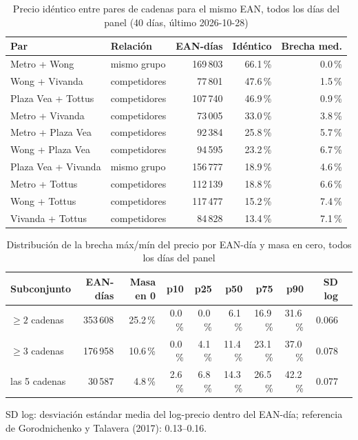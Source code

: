 
\begin{table}[htbp]
\caption{Precio id\'entico entre pares de cadenas para el mismo EAN, todos los d\'ias del panel (40 d\'ias, \'ultimo 2026-10-28)}
\label{tab:identidad}
\centering\scriptsize\setlength{\tabcolsep}{3pt}
\begin{tabular}{@{}llrrr@{}}
\toprule
Par & Relaci\'on & EAN-d\'ias & Id\'entico & Brecha med. \\
\midrule
Metro + Wong & mismo grupo & 169\,803 & 66.1\,\% & 0.0\,\% \\
Wong + Vivanda & competidores & 77\,801 & 47.6\,\% & 1.5\,\% \\
Plaza Vea + Tottus & competidores & 107\,740 & 46.9\,\% & 0.9\,\% \\
Metro + Vivanda & competidores & 73\,005 & 33.0\,\% & 3.8\,\% \\
Metro + Plaza Vea & competidores & 92\,384 & 25.8\,\% & 5.7\,\% \\
Wong + Plaza Vea & competidores & 94\,595 & 23.2\,\% & 6.7\,\% \\
Plaza Vea + Vivanda & mismo grupo & 156\,777 & 18.9\,\% & 4.6\,\% \\
Metro + Tottus & competidores & 112\,139 & 18.8\,\% & 6.6\,\% \\
Wong + Tottus & competidores & 117\,477 & 15.2\,\% & 7.4\,\% \\
Vivanda + Tottus & competidores & 84\,828 & 13.4\,\% & 7.1\,\% \\
\bottomrule\end{tabular}\end{table}

\begin{table}[t]
\caption{Distribuci\'on de la brecha m\'ax/m\'in del precio por EAN-d\'ia y masa en cero, todos los d\'ias del panel}
\label{tab:brecha}
\centering\scriptsize\setlength{\tabcolsep}{4pt}
\begin{tabular}{@{}lrrrrrrrrr@{}}
\toprule
Subconjunto & EAN-d\'ias & Masa en 0 & p10 & p25 & p50 & p75 & p90 & SD log \\
\midrule
$\geq 2$ cadenas & 353\,608 & 25.2\,\% & 0.0\,\% & 0.0\,\% & 6.1\,\% & 16.9\,\% & 31.6\,\% & 0.066 \\
$\geq 3$ cadenas & 176\,958 & 10.6\,\% & 0.0\,\% & 4.1\,\% & 11.4\,\% & 23.1\,\% & 37.0\,\% & 0.078 \\
las 5 cadenas & 30\,587 & 4.8\,\% & 2.6\,\% & 6.8\,\% & 14.3\,\% & 26.5\,\% & 42.2\,\% & 0.077 \\
\bottomrule\end{tabular}
\par\smallskip\raggedright\scriptsize SD log: desviaci\'on est\'andar media del log-precio dentro del EAN-d\'ia; referencia de Gorodnichenko y Talavera (2017): 0.13--0.16.
\end{table}

